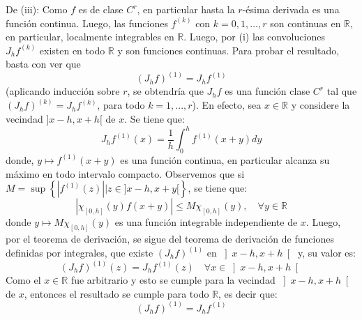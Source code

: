 \documentclass[12pt]{report}
\newcounter{it}
\theoremstyle{largebreak}
\newcommand\abs[1]{\ensuremath{\left|#1\right|}}
\begin{document}
\begin{sol}
        De (iii): Como $f$ es de clase $C^r$, en particular hasta la $r$-ésima derivada es una función continua. Luego, las funciones $f^{(k)}$ con $k=0,1,...,r$ son continuas en $\mathbb{R}$, en particular, localmente integrables en $\mathbb{R}$. Luego, por (i) las convoluciones $J_hf^{(k)}$ existen en todo $\mathbb{R}$ y son funciones continuas. Para probar el resultado, basta con ver que
        \begin{equation*}
            (J_hf)^{(1)}=J_hf^{(1)}
        \end{equation*}
        (aplicando inducción sobre $r$, se obtendría que $J_hf$ es una función clase $C^r$ tal que $\left(J_hf\right)^{(k)}=J_hf^{(k)}$, para todo $k=1,...,r$). En efecto, sea $x\in\mathbb{R}$ y considere la vecindad $]x-h,x+h[$ de $x$. Se tiene que:
        \begin{equation*}
            J_hf^{(1)}(x)=\frac{1}{h}\int_0^hf^{(1)}(x+y)dy
        \end{equation*}
        donde, $y\mapsto f^{(1)}(x+y)$ es una función continua, en particular alcanza su máximo en todo intervalo compacto. Observemos que si $M=\sup\left\{\abs{f^{(1)}(z)}\Big|z\in ]x-h,x+y[ \right\} $, se tiene que:
        \begin{equation*}
            \abs{\chi_{ [0,h]}(y)f(x+y)}\leq M\chi_{[0,h]}(y),\quad\forall y\in\mathbb{R}
        \end{equation*}
        donde $y\mapsto M\chi_{[0,h]}(y)$ es una función integrable independiente de $x$. Luego, por el teorema de derivación, se sigue del teorema de derivación de funciones definidas por integrales, que existe $(J_hf)^{(1)}$ en $\left]x-h,x+h\right[$ y, su valor es:
        \begin{equation*}
            (J_hf)^{(1)}(z)=J_hf^{(1)}(z)\quad\forall x\in\left]x-h,x+h\right[
        \end{equation*}
        Como el $x\in\mathbb{R}$ fue arbitrario y esto se cumple para la vecindad $\left]x-h,x+h\right[$ de $x$, entonces el resultado se cumple para todo $\mathbb{R}$, es decir que:
        \begin{equation*}
            (J_hf)^{(1)}=J_hf^{(1)}
        \end{equation*}
    \end{sol}
\end{document}
